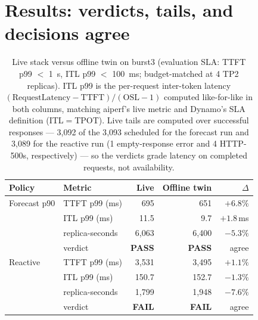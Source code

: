 \section{Results: verdicts, tails, and decisions agree}
\label{sec:val-results}

\begin{table}[htbp]
\centering
\caption[Live stack versus offline twin on burst3]{Live stack versus offline twin on burst3 (evaluation SLA:
TTFT p99 $<$ \SI{1}{\second}, ITL p99 $<$
\SI{100}{\milli\second}; budget-matched at 4 TP2 replicas). ITL p99 is the
per-request inter-token latency $(\text{RequestLatency}-\text{TTFT})/(\text{OSL}-1)$
computed like-for-like in both columns, matching aiperf's live metric and
Dynamo's SLA definition (ITL${=}$TPOT). Live tails are computed over
successful responses --- 3{,}092 of the 3{,}093 scheduled for the
forecast run and 3{,}089 for the reactive run (1 empty-response error and
4 HTTP-500s, respectively) --- so the verdicts grade latency on completed
requests, not availability.}
\label{tab:val-anchor}
\small
\begin{tabular}{@{}llrrr@{}}
\toprule
Policy & Metric & Live & Offline twin & $\Delta$ \\
\midrule
Forecast p90 & TTFT p99 (ms) & 695 & 651 & $+6.8\%$ \\
 & ITL p99 (ms) & 11.5 & 9.7 & $+1.8$\,ms \\
 & replica-seconds & 6{,}063 & 6{,}400 & $-5.3\%$ \\
 & verdict & \textbf{PASS} & \textbf{PASS} & agree \\
\midrule
Reactive & TTFT p99 (ms) & 3{,}531 & 3{,}495 & $+1.1\%$ \\
 & ITL p99 (ms) & 150.7 & 152.7 & $-1.3\%$ \\
 & replica-seconds & 1{,}799 & 1{,}948 & $-7.6\%$ \\
 & verdict & \textbf{FAIL} & \textbf{FAIL} & agree \\
\bottomrule
\end{tabular}
\end{table}

